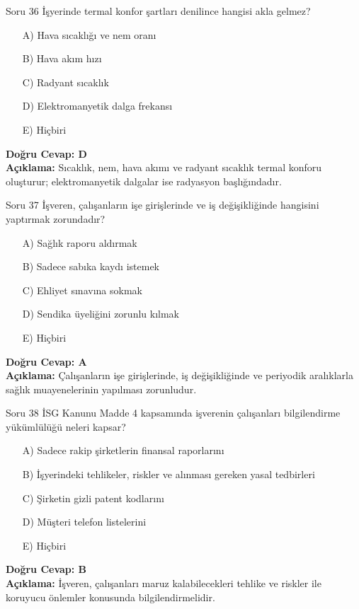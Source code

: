 \documentclass[12pt,a4paper]{article}
\begin{document}
\begin{testcard}{Soru 36}
    İşyerinde termal konfor şartları denilince hangisi akla gelmez?
    \begin{itemize}
        \item[A)] Hava sıcaklığı ve nem oranı
        \item[B)] Hava akım hızı
        \item[C)] Radyant sıcaklık
        \item[D)] Elektromanyetik dalga frekansı
        \item[E)] Hiçbiri
    \end{itemize}
    \tcblower
    \textbf{Doğru Cevap: D} \\
    \textbf{Açıklama:} Sıcaklık, nem, hava akımı ve radyant sıcaklık termal konforu oluşturur; elektromanyetik dalgalar ise radyasyon başlığındadır.
\end{testcard}

\begin{testcard}{Soru 37}
    İşveren, çalışanların işe girişlerinde ve iş değişikliğinde hangisini yaptırmak zorundadır?
    \begin{itemize}
        \item[A)] Sağlık raporu aldırmak
        \item[B)] Sadece sabıka kaydı istemek
        \item[C)] Ehliyet sınavına sokmak
        \item[D)] Sendika üyeliğini zorunlu kılmak
        \item[E)] Hiçbiri
    \end{itemize}
    \tcblower
    \textbf{Doğru Cevap: A} \\
    \textbf{Açıklama:} Çalışanların işe girişlerinde, iş değişikliğinde ve periyodik aralıklarla sağlık muayenelerinin yapılması zorunludur.
\end{testcard}

\begin{testcard}{Soru 38}
    İSG Kanunu Madde 4 kapsamında işverenin çalışanları bilgilendirme yükümlülüğü neleri kapsar?
    \begin{itemize}
        \item[A)] Sadece rakip şirketlerin finansal raporlarını
        \item[B)] İşyerindeki tehlikeler, riskler ve alınması gereken yasal tedbirleri
        \item[C)] Şirketin gizli patent kodlarını
        \item[D)] Müşteri telefon listelerini
        \item[E)] Hiçbiri
    \end{itemize}
    \tcblower
    \textbf{Doğru Cevap: B} \\
    \textbf{Açıklama:} İşveren, çalışanları maruz kalabilecekleri tehlike ve riskler ile koruyucu önlemler konusunda bilgilendirmelidir.
\end{testcard}
\end{document}
